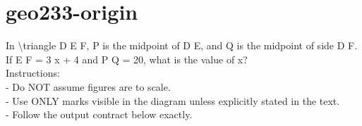 \documentclass[12pt]{article}
\begin{document}
\section*{geo233-origin}
\noindent\begin{minipage}{\textwidth}
\setlength{\parskip}{4pt}
In \textbackslash{}triangle D E F, P is the midpoint of D E, and Q is the midpoint of side D F. If E F = 3 x + 4 and P Q = 20, what is the value of x?\\
Instructions:\\
- Do NOT assume figures are to scale.\\
- Use ONLY marks visible in the diagram unless explicitly stated in the text.\\
- Follow the output contract below exactly.\\
\end{minipage}
\end{document}
